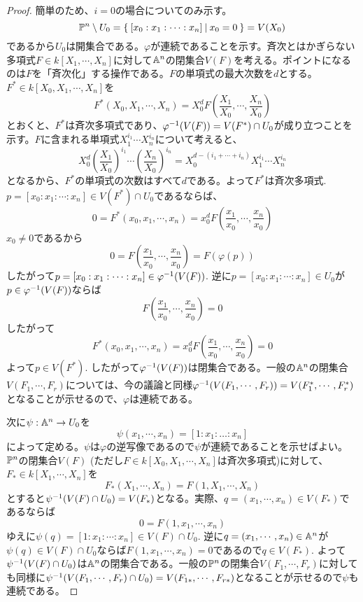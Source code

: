 \documentclass{ltjsreport}
\begin{document}
\begin{proof}
  簡単のため、$i=0$の場合についてのみ示す。
  \[
  \mathbb{P}^n\setminus U_0=\left\{\:[x_0:x_1:\cdots:x_n]\:\middle|\:x_0=0\:\right\}=V(X_0) 
  \]
  であるから$U_0$は開集合である。$\varphi$が連続であることを示す。斉次とはかぎらない多項式$F\in k[X_1,\cdots,X_n]$に対して$\mathbb{A}^n$の閉集合$V(F)$を考える。ポイントになるのは$F$を「斉次化」する操作である。$F$の単項式の最大次数を$d$とする。
  $F^*\in k[X_0,X_1,\cdots,X_n]$を
  \[
  F^*(X_0,X_1,\cdots,X_n)=X_0^dF(\frac{X_1}{X_0},\cdots,\frac{X_n}{X_0})
  \]
  とおくと、$F^*$は斉次多項式であり、$\varphi^{-1}(V(F))=V(F^*)\cap U_0$が成り立つことを示す。$F$に含まれる単項式$X_1^{i_1}\cdots X_n^{i_n}$について考えると、
  \[
  X_0^d(\frac{X_1}{X_0})^{i_1}\cdots(\frac{X_n}{X_0})^{i_n}=X_0^{d-(i_1+\cdots+i_n)}X_1^{i_1}\cdots X_n^{i_n} 
  \]
  となるから、$F^*$の単項式の次数はすべて$d$である。よって$F^*$は斉次多項式. $p=[x_0:x_1:\cdots:x_n]\in V(F^*)\cap U_0$であるならば、
  \[
  0=F^*(x_0,x_1,\cdots,x_n)=x_0^dF(\frac{x_1}{x_0},\cdots,\frac{x_n}{x_0})
  \]
  $x_0\neq 0$であるから
  \[
  0=F(\frac{x_1}{x_0},\cdots,\frac{x_n}{x_0})=F(\varphi(p)) 
  \]
  したがって$p=[x_0:x_1:\cdots:x_n]\in \varphi^{-1}(V(F))$. 逆に$p=[x_0:x_1:\cdots:x_n]\in U_0$が$p\in\varphi^{-1}(V(F))$ならば
  \[
  F(\frac{x_1}{x_0},\cdots,\frac{x_n}{x_0})=0
  \]
  したがって
  \[
  F^*(x_0,x_1,\cdots,x_n)=x_0^dF(\frac{x_1}{x_0},\cdots,\frac{x_n}{x_0})=0
  \]
  よって$p\in V(F^*)$. したがって$\varphi^{-1}(V(F))$は閉集合である。一般の$\mathbb{A}^n$の閉集合$V(F_1,\cdots,F_r)$については、今の議論と同様$\varphi^{-1}(V(F_1,\cdots,F_r))=V(F_1^*,\cdots,F_r^*)$となることが示せるので、$\varphi$は連続である。

  次に$\psi:\mathbb{A}^n\rightarrow U_0$を
  \[
  \psi(x_1,\cdots,x_n)=[1:x_1:\dots:x_n]  
  \]
  によって定める。$\psi$は$\varphi$の逆写像であるので$\psi$が連続であることを示せばよい。$\mathbb{P}^n$の閉集合$V(F)$ (ただし$F\in k[X_0,X_1,\cdots,X_n]$は斉次多項式)に対して、$F_*\in k[X_1,\cdots,X_n]$を
  \[
  F_*(X_1,\cdots,X_n)=F(1,X_1,\cdots,X_n)  
  \]
  とすると$\psi^{-1}(V(F)\cap U_0)=V(F_*)$となる。実際、$q=(x_1,\cdots,x_n)\in V(F_*)$であるならば
  \[
  0=F(1,x_1,\cdots,x_n)  
  \]
  ゆえに$\psi(q)=[1:x_1:\cdots:x_n]\in V(F)\cap U_0$. 逆に$q=(x_1,\cdots,x_n)\in\mathbb{A}^n$が$\psi(q)\in V(F)\cap U_0$ならば$F(1,x_1,\cdots,x_n)=0$であるので$q\in V(F_*)$. よって$\psi^{-1}(V(F)\cap U_0)$は$\mathbb{A}^n$の閉集合である。一般の$\mathbb{P}^n$の閉集合$V(F_1,\cdots,F_r)$に対しても同様に$\psi^{-1}(V(F_1,\cdots,F_r)\cap U_0)=V(F_{1*},\cdots,F_{r*})$となることが示せるので$\psi$も連続である。
\end{proof}
\end{document}
